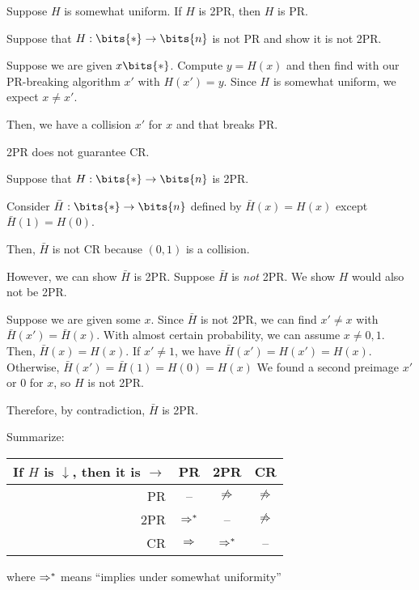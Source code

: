 \documentclass[class=co487,tikz,minted,notes]{agony}
\begin{document}
\begin{prop}
  Suppose $H$ is somewhat uniform. If $H$ is 2PR, then $H$ is PR.
\end{prop}
\begin{prf}
  Suppose that $H : \bits{*} \to \bits{n}$ is not PR and show it is not 2PR.

  Suppose we are given $x \bits{*}$.
  Compute $y = H(x)$ and then find with our PR-breaking algorithm $x'$ with $H(x') = y$.
  Since $H$ is somewhat uniform, we expect $x \neq x'$.

  Then, we have a collision $x'$ for $x$ and that breaks PR.
\end{prf}

\begin{prop}
  2PR does not guarantee CR.
\end{prop}
\begin{prf}
  Suppose that $H : \bits{*} \to \bits{n}$ is 2PR.

  Consider $\bar H : \bits{*} \to \bits{n}$ defined by $\bar H(x) = H(x)$
  except $\bar H(1) = H(0)$.

  Then, $\bar H$ is not CR because $(0,1)$ is a collision.

  However, we can show $\bar H$ is 2PR. Suppose $\bar H$ is \emph{not} 2PR.
  We show $H$ would also not be 2PR.

  Suppose we are given some $x$.
  Since $\bar H$ is not 2PR, we can find $x' \neq x$ with $\bar H(x') = \bar H(x)$.
  With almost certain probability, we can assume $x \neq 0,1$.
  Then, $\bar H(x) = H(x)$.
  If $x' \neq 1$, we have $\bar H(x') = H(x') = H(x)$.
  Otherwise, $\bar H(x') = \bar H(1) = H(0) = H(x)$
  We found a second preimage $x'$ or 0 for $x$, so $H$ is not 2PR.

  Therefore, by contradiction, $\bar H$ is 2PR.
\end{prf}

\begin{theorem}\label{thm:prcr}
  Summarize:
  \begin{center}
    \begin{tabular}{r|ccc}
      If $H$ is $\downarrow$, then it is $\rightarrow$ & PR        & 2PR         & CR          \\ \hline
      PR                                               & --        & $\not\Rightarrow$ & $\not\Rightarrow$ \\
      2PR                                              & $\Rightarrow^*$ & --          & $\not\Rightarrow$ \\
      CR                                               & $\Rightarrow$   & $\Rightarrow^*$   & --
    \end{tabular}
  \end{center}
  where $\Rightarrow^*$ means ``implies under somewhat uniformity''
\end{theorem}
\end{document}
